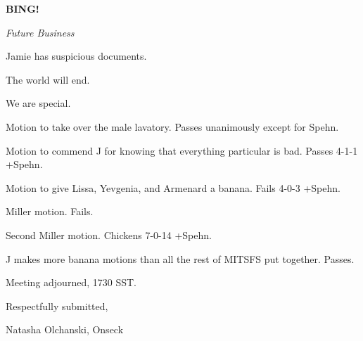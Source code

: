 \documentclass[12pt]{article}
\newcommand{\bing}{{\bf BING!} }
\newcommand{\goto}[1]{\bing \vskip 12pt \centerline{{\em{#1}}}}
\begin{document}
\goto{Future Business}

Jamie has suspicious documents.

The world will end.

We are special.

Motion to take over the male lavatory. Passes unanimously except for Spehn.

Motion to commend J for knowing that everything particular is bad. Passes 4-1-1 +Spehn.

Motion to give Lissa, Yevgenia, and Armenard a banana. Fails 4-0-3 +Spehn.

Miller motion. Fails.

Second Miller motion. Chickens 7-0-14 +Spehn.

J makes more banana motions than all the rest of MITSFS put together. Passes.

\vspace{12pt}

\noindent
Meeting adjourned, 1730 SST.

\vspace{18pt}

\centerline{Respectfully submitted,}
\centerline{Natasha Olchanski, Onseck}
\end{document}
